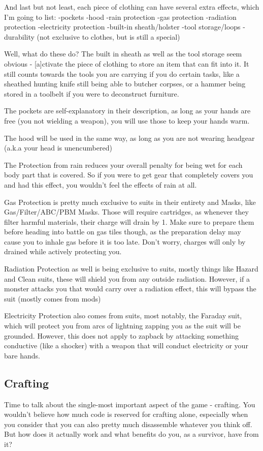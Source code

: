 And last but not least, each piece of clothing can have several extra effects, which I'm going to list:
-pockets
-hood
-rain protection
-gas protection
-radiation protection
-electricity protection
-built-in sheath/holster
-tool storage/loops
-durability (not exclusive to clothes, but is still a special)

Well, what do these do?
The built in sheath as well as the tool storage seem obvious - [a]ctivate the piece of clothing to store an item that can fit into it. It still counts towards the tools you are carrying if you do certain tasks, like a sheathed hunting knife still being able to butcher corpses, or a hammer being stored in a toolbelt if you were to deconstruct furniture.

The pockets are self-explanatory in their description, as long as your hands are free (you not wielding a weapon), you will use those to keep your hands warm.

The hood will be used in the same way, as long as you are not wearing headgear (a.k.a your head is unencumbered)

The Protection from rain reduces your overall penalty for being wet for each body part that is covered. So if you were to get gear that completely covers you and had this effect, you wouldn't feel the effects of rain at all.

Gas Protection is pretty much exclusive to suits in their entirety and Masks, like Gas/Filter/ABC/PBM Masks. Those will require cartridges, as whenever they filter harmful materials, their charge will drain by 1. Make sure to prepare them before heading into battle on gas tiles though, as the preparation delay may cause you to inhale gas before it is too late. Don't worry, charges will only by drained while actively protecting you.

Radiation Protection as well is being exclusive to suits, mostly things like Hazard and Clean suits, these will shield you from any outside radiation. However, if a monster attacks you that would carry over a radiation effect, this will bypass the suit (mostly comes from mods)

Electricity Protection also comes from suits, most notably, the Faraday suit, which will protect you from arcs of lightning zapping you as the suit will be grounded. However, this does not apply to zapback by attacking something conductive (like a shocker) with a weapon that will conduct electricity or your bare hands.

\subsection{Crafting}
Time to talk about the single-most important aspect of the game - crafting.
You wouldn't believe how much code is reserved for crafting alone, especially when you consider that you can also pretty much disassemble whatever you think off. But how does it actually work and what benefits do you, as a survivor, have from it?

